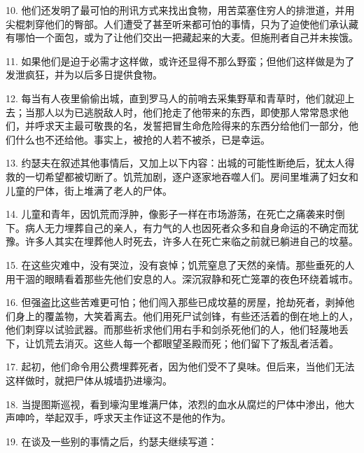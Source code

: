 10. 他们还发明了最可怕的刑讯方式来找出食物，用苦菜塞住穷人的排泄道，并用尖棍刺穿他们的臀部。人们遭受了甚至听来都可怕的事情，只为了迫使他们承认藏有哪怕一个面包，或为了让他们交出一把藏起来的大麦。但施刑者自己并未挨饿。\par

11. 如果他们是迫于必需才这样做，或许还显得不那么野蛮；但他们这样做是为了发泄疯狂，并为以后多日提供食物。\par

12. 每当有人夜里偷偷出城，直到罗马人的前哨去采集野草和青草时，他们就迎上去；当那人以为已逃脱敌人时，他们抢走了他带来的东西，即使那人常常恳求他们，并呼求天主最可敬畏的名，发誓把冒生命危险得来的东西分给他们一部分，他们什么也不还给他。事实上，被抢的人若不被杀，已是幸运。\par

13. 约瑟夫在叙述其他事情后，又加上以下内容：出城的可能性断绝后，犹太人得救的一切希望都被切断了。饥荒加剧，逐户逐家地吞噬人们。房间里堆满了妇女和儿童的尸体，街上堆满了老人的尸体。\par

14. 儿童和青年，因饥荒而浮肿，像影子一样在市场游荡，在死亡之痛袭来时倒下。病人无力埋葬自己的亲人，有力气的人也因死者众多和自身命运的不确定而犹豫。许多人其实在埋葬他人时死去，许多人在死亡来临之前就已躺进自己的坟墓。\par

15. 在这些灾难中，没有哭泣，没有哀悼；饥荒窒息了天然的亲情。那些垂死的人用干涸的眼睛看着那些先他们安息的人。深沉寂静和死亡笼罩的夜色环绕着城市。\par

16. 但强盗比这些苦难更可怕；他们闯入那些已成坟墓的房屋，抢劫死者，剥掉他们身上的覆盖物，大笑着离去。他们用死尸试剑锋，有些还活着的倒在地上的人，他们刺穿以试验武器。而那些祈求他们用右手和剑杀死他们的人，他们轻蔑地丢下，让饥荒去消灭。这些人每一个都眼望圣殿而死；他们留下了叛乱者活着。\par

17. 起初，他们命令用公费埋葬死者，因为他们受不了臭味。但后来，当他们无法这样做时，就把尸体从城墙扔进壕沟。\par

18. 当提图斯巡视，看到壕沟里堆满尸体，浓烈的血水从腐烂的尸体中渗出，他大声呻吟，举起双手，呼求天主作证这不是他的作为。\par

19. 在谈及一些别的事情之后，约瑟夫继续写道：\par

